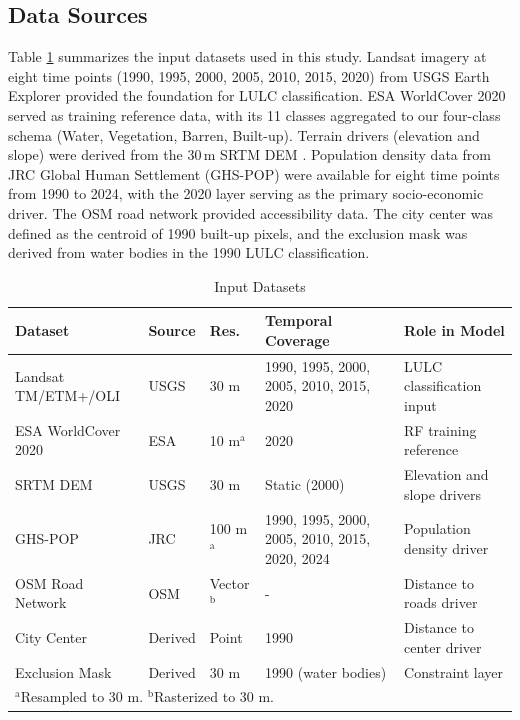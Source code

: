 \documentclass[12pt,a4paper]{article}
\begin{document}
\subsection{Data Sources}
Table \ref{tab:datasets} summarizes the input datasets used in this study. Landsat imagery at eight time points (1990, 1995, 2000, 2005, 2010, 2015, 2020) from USGS Earth Explorer provided the foundation for LULC classification. ESA WorldCover 2020 \cite{zanaga2021} served as training reference data, with its 11 classes aggregated to our four-class schema (Water, Vegetation, Barren, Built-up). Terrain drivers (elevation and slope) were derived from the 30\,m SRTM DEM \cite{farr2007}. Population density data from JRC Global Human Settlement (GHS-POP) were available for eight time points from 1990 to 2024, with the 2020 layer serving as the primary socio-economic driver. The OSM road network provided accessibility data. The city center was defined as the centroid of 1990 built-up pixels, and the exclusion mask was derived from water bodies in the 1990 LULC classification.

\begin{table}[H]
\caption{Input Datasets}
\label{tab:datasets}
\centering
\small
\renewcommand{\arraystretch}{1.3}  %
\begin{tabular}{lllp{2.8cm}p{3.5cm}}
\toprule
\textbf{Dataset} & \textbf{Source} & \textbf{Res.} & \textbf{Temporal Coverage} & \textbf{Role in Model} \\
\midrule
Landsat TM/ETM+/OLI & USGS & 30 m & 1990, 1995, 2000, 2005, 2010, 2015, 2020 & LULC classification input \\
ESA WorldCover 2020 & ESA & 10 m$^{\mathrm{a}}$ & 2020 & RF training reference \\
SRTM DEM & USGS & 30 m & Static (2000) & Elevation and slope drivers \\
GHS-POP & JRC & 100 m$^{\mathrm{a}}$ & 1990, 1995, 2000, 2005, 2010, 2015, 2020, 2024 & Population density driver \\
OSM Road Network & OSM & Vector$^{\mathrm{b}}$ & - & Distance to roads driver \\
City Center & Derived & Point & 1990 & Distance to center driver \\
Exclusion Mask & Derived & 30 m & 1990 (water bodies) & Constraint layer \\
\bottomrule
\multicolumn{5}{l}{\scriptsize $^{\mathrm{a}}$Resampled to 30 m. $^{\mathrm{b}}$Rasterized to 30 m.}
\end{tabular}
\end{table}
\end{document}
